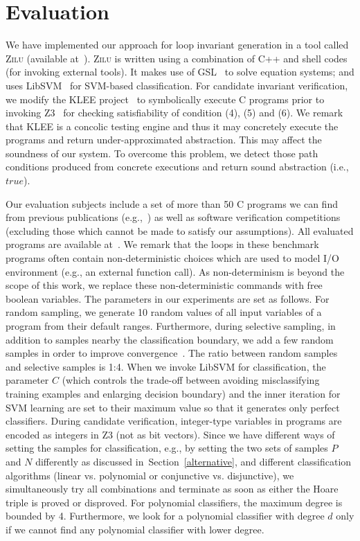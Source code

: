 \section{Evaluation} %
\label{sec:evaluations}
We have implemented our approach for loop invariant generation in a tool called \textsc{Zilu} (available at~\cite{zilu:repo}).
\textsc{Zilu} is written using a combination of C++ and shell codes (for invoking external tools). It makes use of GSL~\cite{gough2009gnu} to solve equation systems; and uses LibSVM~\cite{chang2011libsvm} for SVM-based classification. For candidate invariant verification, we modify the KLEE project~\cite{cadar2008klee} to symbolically execute C programs prior to invoking Z3~\cite{de2008z3} for checking satisfiability of
condition (4), (5) and (6). We remark that KLEE is a concolic testing engine and thus it may concretely execute the programs and return under-approximated abstraction. This may affect the soundness of our system.
To overcome this problem, we detect those path conditions produced from concrete executions and return sound abstraction (i.e., $true$). %

Our evaluation subjects include a set of more than 50 C programs we can find from previous publications (e.g.,~\cite{DBLP:conf/pldi/GulwaniSV08,sharma2012interpolants,gulavani2008automatically,jeannet2010interproc,isil2013inductive}) as well as software verification competitions~\cite{Dirk:SVCOMP:2016} %
 (excluding those which cannot be made to satisfy our assumptions). All evaluated programs are available at~\cite{zilu:repo}. We remark that the loops in these benchmark programs often contain non-deterministic choices which are used to model I/O environment (e.g., an external function call). As non-determinism is beyond the scope of this work, we replace these non-deterministic commands with free boolean variables. The parameters in our experiments are set as follows. For random sampling, we generate 10 random values of all input variables of a program from their default ranges. Furthermore, during selective sampling, in addition to samples nearby the classification boundary, we add a few random samples in order to improve convergence~\cite{DBLP:conf/icml/SchohnC00}. The ratio between random samples and selective samples is 1:4. When we invoke LibSVM for classification, the parameter $C$ (which controls the trade-off between avoiding misclassifying training examples and enlarging decision boundary) and the inner iteration for SVM learning are set to their maximum value so that it generates only perfect classifiers. During candidate verification, integer-type variables in programs are encoded as integers in Z3 (not as bit vectors). Since we have different ways of setting the samples for classification, e.g., by setting the two sets of samples $P$ and $N$ differently as discussed in~Section~\ref{alternative}, and different classification algorithms (linear vs. polynomial or conjunctive vs. disjunctive), we simultaneously try all combinations and terminate as soon as either the Hoare triple is proved or disproved. For polynomial classifiers, the maximum degree is bounded by 4. Furthermore, we look for a polynomial classifier with degree $d$ only if we cannot find any polynomial classifier with lower degree.

